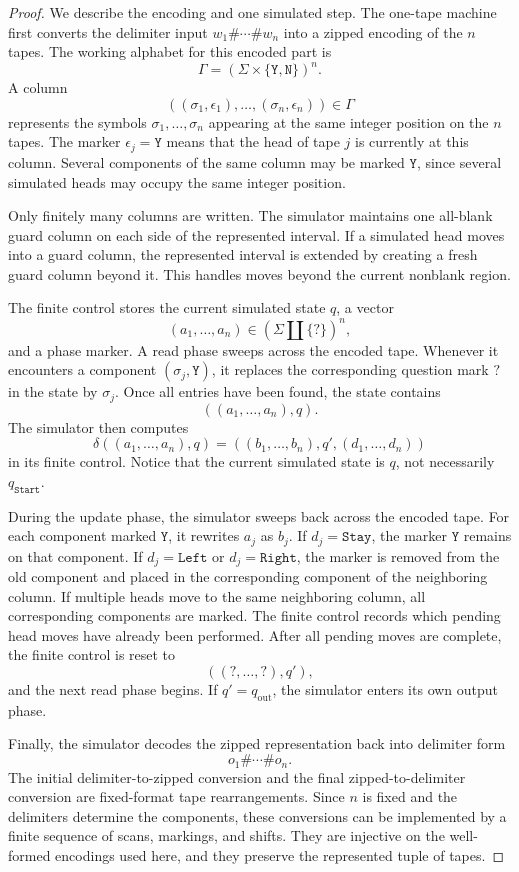 \documentclass[12pt]{article}
\theoremstyle{plain}
\theoremstyle{definition}
\newcommand{\Heads}{\{\texttt{Y},\texttt{N}\}}
\newcommand{\Start}{q_{\texttt{Start}}}
\begin{document}
\begin{proof}
We describe the encoding and one simulated step. The one-tape machine first converts the delimiter input $w_1\#\cdots\#w_n$ into a zipped encoding of the $n$ tapes. The working alphabet for this encoded part is
\[
\Gamma=(\Sigma\times\Heads)^n.
\]
A column
\[
((\sigma_1,\epsilon_1),\ldots,(\sigma_n,\epsilon_n))\in\Gamma
\]
represents the symbols $\sigma_1,\ldots,\sigma_n$ appearing at the same integer position on the $n$ tapes. The marker $\epsilon_j=\texttt{Y}$ means that the head of tape $j$ is currently at this column. Several components of the same column may be marked $\texttt{Y}$, since several simulated heads may occupy the same integer position.

Only finitely many columns are written. The simulator maintains one all-blank guard column on each side of the represented interval. If a simulated head moves into a guard column, the represented interval is extended by creating a fresh guard column beyond it. This handles moves beyond the current nonblank region.

The finite control stores the current simulated state $q$, a vector
\[
(a_1,\ldots,a_n)\in(\Sigma\coprod\{\texttt{?}\})^n,
\]
and a phase marker. A read phase sweeps across the encoded tape. Whenever it encounters a component $(\sigma_j,\texttt{Y})$, it replaces the corresponding question mark $\texttt{?}$ in the state by $\sigma_j$. Once all entries have been found, the state contains
\[
((a_1,\ldots,a_n),q).
\]
The simulator then computes
\[
\delta((a_1,\ldots,a_n),q)=((b_1,\ldots,b_n),q',(d_1,\ldots,d_n))
\]
in its finite control. Notice that the current simulated state is $q$, not necessarily $\Start$.

During the update phase, the simulator sweeps back across the encoded tape. For each component marked $\texttt{Y}$, it rewrites $a_j$ as $b_j$. If $d_j=\texttt{Stay}$, the marker $\texttt{Y}$ remains on that component. If $d_j=\texttt{Left}$ or $d_j=\texttt{Right}$, the marker is removed from the old component and placed in the corresponding component of the neighboring column. If multiple heads move to the same neighboring column, all corresponding components are marked. The finite control records which pending head moves have already been performed. After all pending moves are complete, the finite control is reset to
\[
((\texttt{?},\ldots,\texttt{?}),q'),
\]
and the next read phase begins. If $q'=q_{\mathrm{out}}$, the simulator enters its own output phase.

Finally, the simulator decodes the zipped representation back into delimiter form
\[
o_1\#\cdots\#o_n.
\]
The initial delimiter-to-zipped conversion and the final zipped-to-delimiter conversion are fixed-format tape rearrangements. Since $n$ is fixed and the delimiters determine the components, these conversions can be implemented by a finite sequence of scans, markings, and shifts. They are injective on the well-formed encodings used here, and they preserve the represented tuple of tapes.
\end{proof}
\end{document}
